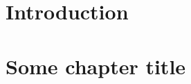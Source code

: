 \documentclass[11pt,openright,oneside,letterpaper,onecolumn]{report}  %
\begin{document}
\pagestyle{empty}

\thesistitlepage
\thesiscopyrightpage

\thesisabstract


\pagestyle{plain}

\setlength{\footskip}{0.5in}

\setcounter{tocdepth}{2}
\renewcommand{\contentsname}{Table of Contents}
\tableofcontents
\cleardoublepage                         

\listoffigures
\cleardoublepage

\listoftables 
\cleardoublepage


\cleardoublepage



\pagestyle{headings}

%
%
\setlength{\textheight}{8.5in}
\setlength{\footskip}{0in}
\baselineskip=26pt

 {%
\fancyhf{}
\fancyhead[LE,RO]{\thepage}
\fancyhead[RE,LO]{\itshape \leftmark}
\renewcommand{\headrulewidth}{0pt}
}
\pagestyle{plain}

\chapter{Introduction}
\label{section:intro}



\chapter{Some chapter title}
\label{chapter1}

\end{document}
